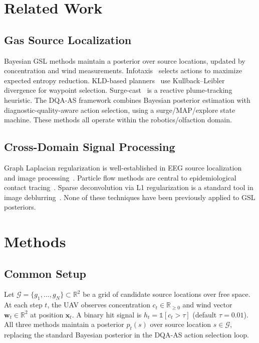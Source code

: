 \documentclass[conference]{IEEEtran}
\begin{document}
\section{Related Work}

\subsection{Gas Source Localization}
Bayesian GSL methods maintain a posterior over source locations, updated by concentration and wind measurements.
Infotaxis~\cite{vergassola2007infotaxis} selects actions to maximize expected entropy reduction.
KLD-based planners~\cite{hernandez2016active} use Kullback--Leibler divergence for waypoint selection.
Surge-cast~\cite{martinez2006odor} is a reactive plume-tracking heuristic.
The DQA-AS framework combines Bayesian posterior estimation with diagnostic-quality-aware action selection, using a surge/MAP/explore state machine.
These methods all operate within the robotics/olfaction domain.

\subsection{Cross-Domain Signal Processing}
Graph Laplacian regularization is well-established in EEG source localization~\cite{pascual1994low} and image processing~\cite{he2010laplacian}.
Particle flow methods are central to epidemiological contact tracing~\cite{wallinga2004different}.
Sparse deconvolution via L1 regularization is a standard tool in image deblurring~\cite{beck2009fast}.
None of these techniques have been previously applied to GSL posteriors.

\section{Methods}

\subsection{Common Setup}
Let $\mathcal{G} = \{g_1, \ldots, g_N\} \subset \mathbb{R}^2$ be a grid of candidate source locations over free space.
At each step $t$, the UAV observes concentration $c_t \in \mathbb{R}_{\geq 0}$ and wind vector $\mathbf{w}_t \in \mathbb{R}^2$ at position $\mathbf{x}_t$.
A binary hit signal is $h_t = \mathbb{1}[c_t > \tau]$ (default $\tau = 0.01$).
All three methods maintain a posterior $p_t(s)$ over source location $s \in \mathcal{G}$, replacing the standard Bayesian posterior in the DQA-AS action selection loop.
\end{document}
